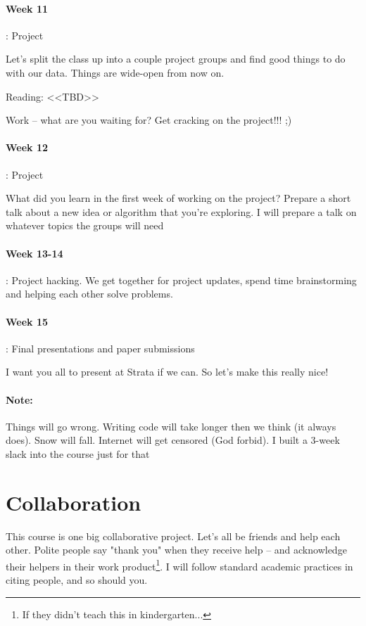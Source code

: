 \documentclass[12pt]{article}
\begin{document}
\paragraph{Week 11}: Project

Let's split the class up into a couple project groups and find good things to do with our data. Things are wide-open from now on.

Reading: <<TBD>>

Work -- what are you waiting for? Get cracking on the project!!! ;)

\paragraph{Week 12}: Project

What did you learn in the first week of working on the project? Prepare a short talk about a new idea or algorithm that you're exploring. 
I will prepare a talk on whatever topics the groups will need

\paragraph{Week 13-14}: Project hacking. 
We get together for project updates, spend time brainstorming and helping each other solve problems. 

\paragraph{Week 15}: Final presentations and paper submissions

I want you all to present at Strata if we can. So let's make this really nice!


\paragraph{Note:} 
Things will go wrong. Writing code will take longer then we think (it always does). Snow will fall. Internet will get censored (God forbid). I built a 3-week slack into the course just for that


\section{Collaboration}

This course is one big collaborative project. Let's all be friends and help each other. Polite people say "thank you" when they receive help -- and acknowledge their helpers in their work product\footnote{If they didn't teach this in kindergarten...}. I will follow standard academic practices in citing people, and so should you. 
\end{document}
